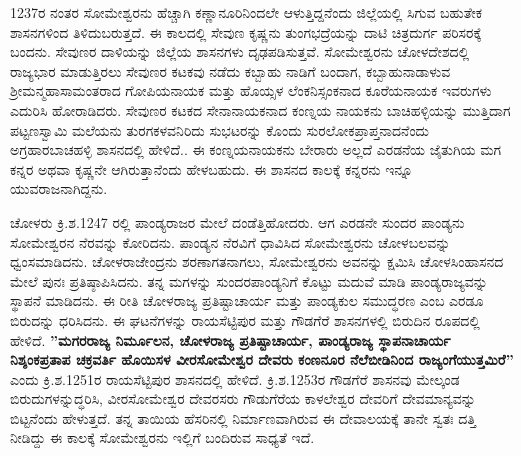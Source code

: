 1237ರ ನಂತರ ಸೋಮೇಶ್ವರನು ಹೆಚ್ಚಾಗಿ ಕಣ್ಣಾನೂರಿನಿಂದಲೇ ಆಳುತ್ತಿದ್ದನೆಂದು ಜಿಲ್ಲೆಯಲ್ಲಿ ಸಿಗುವ ಬಹುತೇಕ ಶಾಸನಗಳಿಂದ ತಿಳಿದುಬರುತ್ತದೆ. ಈ ಕಾಲದಲ್ಲಿ ಸೇವುಣ ಕೃಷ್ಣನು ತುಂಗಭದ್ರೆಯನ್ನು ದಾಟಿ ಚಿತ್ರದುರ್ಗ ಪರಿಸರಕ್ಕೆ ಬಂದನು. ಸೇವುಣರ ದಾಳಿಯನ್ನು ಜಿಲ್ಲೆಯ ಶಾಸನಗಳು ದೃಢಪಡಿಸುತ್ತವೆ. ಸೋಮೇಶ್ವರನು ಚೋಳದೇಶದಲ್ಲಿ ರಾಜ್ಯಭಾರ ಮಾಡುತ್ತಿರಲು ಸೇವುಣರ ಕಟಕವು ನಡೆದು ಕಬ್ಬಾಹು ನಾಡಿಗೆ ಬಂದಾಗ, ಕಬ್ಬಾಹುನಾಡಾಳುವ ಶ‍್ರೀಮನ್ಮಹಾಸಾಮಂತರಾದ ಗೋಪಿಯನಾಯಕ ಮತ್ತು ಹೊಯ್ಸಳ ಲೆಂಕನಿಸ್ಸಂಕನಾದ ಕೂರೆಯನಾಯಕ ಇವರುಗಳು ಎದುರಿಸಿ ಹೋರಾಡಿದರು. ಸೇವುಣರ ಕಟಕದ ಸೇನಾನಾಯಕನಾದ ಕಂಣ್ನಯ ನಾಯಕನು ಬಾಚಿಹಳ್ಳಿಯನ್ನು ಮುತ್ತಿದಾಗ ಪಟ್ಟಣಸ್ವಾಮಿ ಮಲೆಯನು ತುರಗಕಳವನಿರಿದು ಸುಭಟರನ್ನು ಕೊಂದು ಸುರಲೋಕಪ್ರಾಪ್ತನಾದನೆಂದು ಅಗ್ರಹಾರಬಾಚಹಳ್ಳಿ ಶಾಸನದಲ್ಲಿ ಹೇಳಿದೆ.. ಈ ಕಂಣ್ನಯನಾಯಕನು ಬೇರಾರು ಅಲ್ಲದೆ ಎರಡನೆಯ ಜೈತುಗಿಯ ಮಗ ಕನ್ನರ ಅಥವಾ ಕೃಷ್ಣನೇ ಆಗಿರುತ್ತಾನೆಂದು ಹೇಳಬಹುದು. ಈ ಶಾಸನದ ಕಾಲಕ್ಕೆ ಕನ್ನರನು ಇನ್ನೂ ಯುವರಾಜನಾಗಿದ್ದನು.

ಚೋಳರು ಕ್ರಿ.ಶ.1247 ರಲ್ಲಿ ಪಾಂಡ್ಯರಾಜರ ಮೇಲೆ ದಂಡೆತ್ತಿಹೋದರು. ಆಗ ಎರಡನೇ ಸುಂದರ ಪಾಂಡ್ಯನು ಸೋಮೇಶ್ವರನ ನೆರವನ್ನು ಕೋರಿದನು. ಪಾಂಡ್ಯನ ನೆರವಿಗೆ ಧಾವಿಸಿದ ಸೋಮೇಶ್ವರನು ಚೋಳಬಲವನ್ನು ಧ್ವಂಸಮಾಡಿದನು. ಚೋಳರಾಜೇಂದ್ರನು ಶರಣಾಗತನಾಗಲು, ಸೋಮೇಶ್ವರನು ಅವನನ್ನು ಕ್ಷಮಿಸಿ ಚೋಳಸಿಂಹಾಸನದ ಮೇಲೆ ಪುನಃ ಪ್ರತಿಷ್ಠಾಪಿ\-ಸಿದನು. ತನ್ನ ಮಗಳನ್ನು ಸುಂದರಪಾಂಡ್ಯನಿಗೆ ಕೊಟ್ಟು ಮದುವೆ ಮಾಡಿ ಪಾಂಡ್ಯರಾಜ್ಯವನ್ನು ಸ್ಥಾಪನೆ ಮಾಡಿದನು. ಈ ರೀತಿ ಚೋಳರಾಜ್ಯ ಪ್ರತಿಷ್ಟಾಚಾರ್ಯ ಮತ್ತು ಪಾಂಡ್ಯಕುಲ ಸಮುದ್ಧರಣ ಎಂಬ ಎರಡೂ ಬಿರುದನ್ನು ಧರಿಸಿದನು. ಈ ಘಟನೆಗಳನ್ನು ರಾಯಸೆಟ್ಟಿಪುರ ಮತ್ತು ಗೌಡಗೆರೆ ಶಾಸನಗಳಲ್ಲಿ ಬಿರುದಿನ ರೂಪದಲ್ಲಿ ಹೇಳಿದೆ. \textbf{''ಮಗರರಾಜ್ಯ ನಿರ್ಮೂಲನ, ಚೋಳರಾಜ್ಯ ಪ್ರತಿಷ್ಟಾಚಾರ್ಯ, ಪಾಂಡ್ಯರಾಜ್ಯ ಸ್ಥಾಪನಾಚಾರ್ಯ ನಿಶ್ಶಂಕಪ್ರತಾಪ ಚಕ್ರವರ್ತಿ ಹೊಯಿಸಳ ವೀರಸೋಮೇಶ್ವರ ದೇವರು ಕಂಣನೂರ ನೆಲೆಬೀಡಿನಿಂದ ರಾಜ್ಯಂಗೆಯುತ್ತಮಿರೆ''} ಎಂದು ಕ್ರಿ.ಶ.1251ರ ರಾಯಸೆಟ್ಟಿಪುರ ಶಾಸನದಲ್ಲಿ ಹೇಳಿದೆ. ಕ್ರಿ.ಶ.1253ರ ಗೌಡಗೆರೆ ಶಾಸನವು ಮೇಲ್ಕಂಡ ಬಿರುದುಗಳನ್ನುದ್ಧರಿಸಿ, ವೀರಸೋಮೇಶ್ವರ ದೇವರಸರು ಗೌಡುಗೆರೆಯ ಕಾಳಲೇಶ್ವರ ದೇವರಿಗೆ ದೇವಮಾನ್ಯವನ್ನು ಬಿಟ್ಟನೆಂದು ಹೇಳುತ್ತದೆ. ತನ್ನ ತಾಯಿಯ ಹೆಸರಿನಲ್ಲಿ ನಿರ್ಮಾಣವಾಗಿರುವ ಈ ದೇವಾಲಯಕ್ಕೆ ತಾನೇ ಸ್ವತಃ ದತ್ತಿ ನೀಡಿದ್ದು ಈ ಕಾಲಕ್ಕೆ ಸೋಮೇಶ್ವರನು ಇಲ್ಲಿಗೆ ಬಂದಿರುವ ಸಾಧ್ಯತೆ ಇದೆ.

